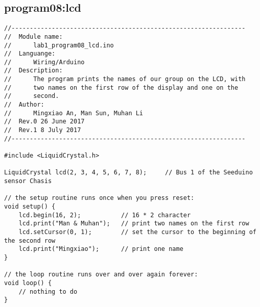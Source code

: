 \subsection{program08:lcd}
\begin{verbatim}
//----------------------------------------------------------------
//  Module name:
//      lab1_program08_lcd.ino
//  Languange:
//      Wiring/Arduino
//  Description:
//      The program prints the names of our group on the LCD, with
//      two names on the first row of the display and one on the
//      second.
//  Author:
//      Mingxiao An, Man Sun, Muhan Li
//  Rev.0 26 June 2017
//  Rev.1 8 July 2017
//----------------------------------------------------------------

#include <LiquidCrystal.h>

LiquidCrystal lcd(2, 3, 4, 5, 6, 7, 8);     // Bus 1 of the Seeduino sensor Chasis

// the setup routine runs once when you press reset:
void setup() {
    lcd.begin(16, 2);           // 16 * 2 character
    lcd.print("Man & Muhan");   // print two names on the first row
    lcd.setCursor(0, 1);        // set the cursor to the beginning of the second row
    lcd.print("Mingxiao");      // print one name
}

// the loop routine runs over and over again forever:
void loop() {
    // nothing to do
}
\end{verbatim}

